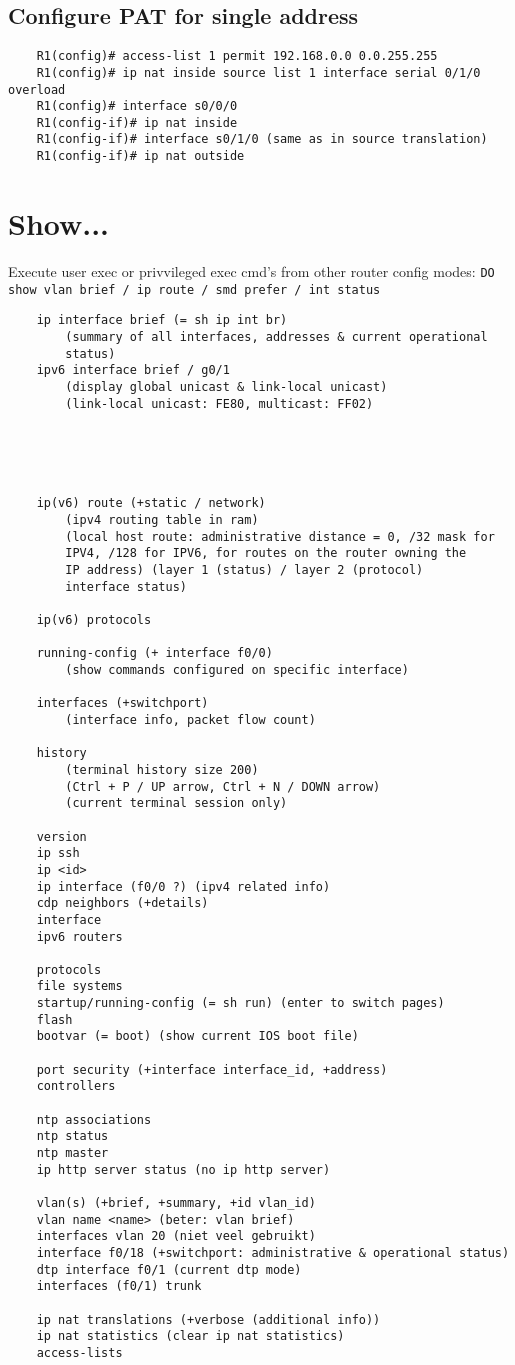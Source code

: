 \documentclass[10pt, a4paper]{article}
\begin{document}
	\subsection{Configure PAT for single address}
	\begin{lstlisting}
	R1(config)# access-list 1 permit 192.168.0.0 0.0.255.255
	R1(config)# ip nat inside source list 1 interface serial 0/1/0 overload
	R1(config)# interface s0/0/0
	R1(config-if)# ip nat inside
	R1(config-if)# interface s0/1/0 (same as in source translation)
	R1(config-if)# ip nat outside
	\end{lstlisting}
	
	
	\section{Show...}
	Execute user exec or privvileged exec cmd's from other 
	router config modes: \texttt{DO show vlan brief / ip route / smd prefer / int status} \\
	
	\begin{lstlisting}
	ip interface brief (= sh ip int br)
		(summary of all interfaces, addresses & current operational 
		status)
	ipv6 interface brief / g0/1
		(display global unicast & link-local unicast) 
		(link-local unicast: FE80, multicast: FF02)
		
		
		
		

	ip(v6) route (+static / network)
		(ipv4 routing table in ram)
		(local host route: administrative distance = 0, /32 mask for 
		IPV4, /128 for IPV6, for routes on the router owning the 
		IP address) (layer 1 (status) / layer 2 (protocol) 
		interface status)
		
	ip(v6) protocols
		
	running-config (+ interface f0/0) 
		(show commands configured on specific interface)
		
	interfaces (+switchport)
		(interface info, packet flow count)
	
	history 
		(terminal history size 200)
		(Ctrl + P / UP arrow, Ctrl + N / DOWN arrow)
		(current terminal session only)
	
	version
	ip ssh
	ip <id>
	ip interface (f0/0 ?) (ipv4 related info)
	cdp neighbors (+details)
	interface
	ipv6 routers
	
	protocols
	file systems
	startup/running-config (= sh run) (enter to switch pages)
	flash
	bootvar (= boot) (show current IOS boot file)
	
	port security (+interface interface_id, +address)
	controllers
	
	ntp associations
	ntp status
	ntp master
	ip http server status (no ip http server)
	
	vlan(s) (+brief, +summary, +id vlan_id)
	vlan name <name> (beter: vlan brief)
	interfaces vlan 20 (niet veel gebruikt)
	interface f0/18 (+switchport: administrative & operational status)
	dtp interface f0/1 (current dtp mode)
	interfaces (f0/1) trunk
	
	ip nat translations (+verbose (additional info)) 
	ip nat statistics (clear ip nat statistics)
	access-lists
	\end{lstlisting}
	
\end{document}
